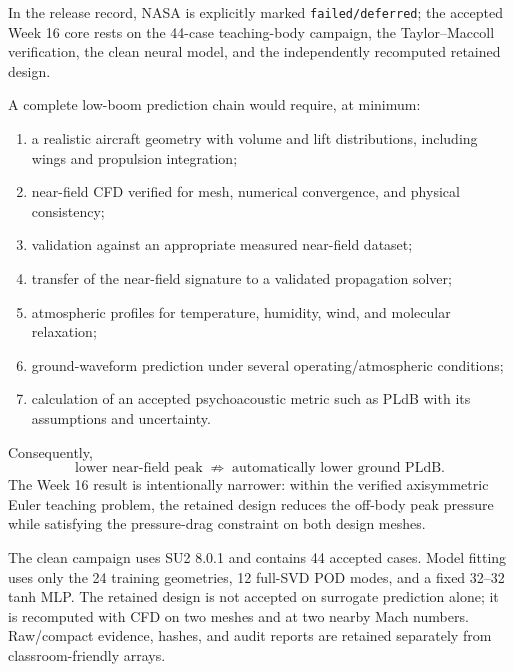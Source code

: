 In the release record, NASA is explicitly marked \texttt{failed/deferred}; the accepted Week 16 core rests on the 44-case teaching-body campaign, the Taylor--Maccoll verification, the clean neural model, and the independently recomputed retained design.


A complete low-boom prediction chain would require, at minimum:
\begin{enumerate}
\item a realistic aircraft geometry with volume and lift distributions, including wings and propulsion integration;
\item near-field CFD verified for mesh, numerical convergence, and physical consistency;
\item validation against an appropriate measured near-field dataset;
\item transfer of the near-field signature to a validated propagation solver;
\item atmospheric profiles for temperature, humidity, wind, and molecular relaxation;
\item ground-waveform prediction under several operating/atmospheric conditions;
\item calculation of an accepted psychoacoustic metric such as PLdB with its assumptions and uncertainty.
\end{enumerate}
Consequently,
\begin{equation}
 \boxed{\text{lower near-field peak}\;\not\Rightarrow\;\text{automatically lower ground PLdB}.}
\end{equation}
The Week 16 result is intentionally narrower: within the verified axisymmetric Euler teaching problem, the retained design reduces the off-body peak pressure while satisfying the pressure-drag constraint on both design meshes.

The clean campaign uses SU2 8.0.1 and contains 44 accepted cases. Model fitting uses only the 24 training geometries, 12 full-SVD POD modes, and a fixed 32--32 tanh MLP. The retained design is not accepted on surrogate prediction alone; it is recomputed with CFD on two meshes and at two nearby Mach numbers. Raw/compact evidence, hashes, and audit reports are retained separately from classroom-friendly arrays.

